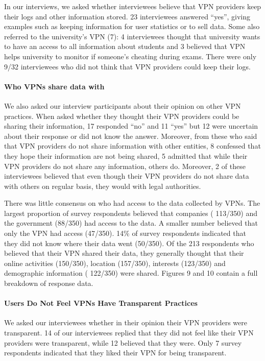 In our interviews, we asked whether
interviewees believe that VPN providers keep their logs and other information stored.
23 interviewees answered “yes”, giving examples such as keeping information
for user statistics or to sell data. Some also referred to the
university’s VPN (7): 4 interviewees thought that university wants to have an
access to all information about students and 3 believed that VPN helps university to monitor
if someone’s cheating during exams. There were only 9/32 interviewees who did not
think that VPN providers could keep their logs.



\paragraph{Who VPNs share data with} We also asked our interview participants
about their opinion on other VPN practices. When asked whether they thought
their VPN providers could be sharing their information, 17 responded “no” and
11 “yes” but 12 were uncertain about their response or did not know the
answer.  Moreover, from these who said that VPN providers do not share
information with other entities, 8 confessed that they hope their information
are not being shared, 5 admitted that while their VPN providers do not share
any information, others do. Moreover, 2 of these interviewees believed that
even though their VPN providers do not share data with others on regular
basis, they would with legal authorities. 

There was little consensus on who had access to the data collected by VPNs.
The largest proportion of survey respondents believed that companies (
113/350) and the government (88/350) had access to the data. A
smaller number believed that only the VPN had access (47/350). 14\% of survey respondents indicated that they did not know where
their data went (50/350). Of the 213 respondents who believed that their
VPN shared their data, they generally thought that their online activities
(150/350), location (157/350), interests (123/350) and
demographic information ( 122/350) were shared. Figures 9 and 10 contain
a full breakdown of response data.

\paragraph{Users Do Not Feel VPNs Have Transparent Practices}
We asked our interviewees whether in
their opinion their VPN providers were transparent. 14 of our interviewees
replied that they did not feel like their VPN providers were transparent,
while 12 believed that they were. Only 7 survey respondents indicated that they liked their VPN for being transparent.

